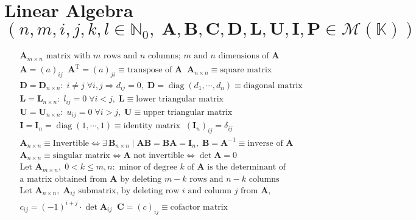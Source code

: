 \section*{\normalsize Linear Algebra {\normalfont\scriptsize $(n,m,i,j,k,l\!\in\!\mathbb{N}_0,\;\mathbf{A},\mathbf{B},\mathbf{C},\mathbf{D},\mathbf{L},\mathbf{U},\mathbf{I},\mathbf{P}\!\in\!\mathcal{M}(\mathbb{K}))$}}
\underline{}\normalfont\scriptsize{}
\begin{align*}
&\mathbf{A}_{m\times n}\text{ matrix with $m$ rows and $n$ columns; $m$ and $n$ dimensions of $\mathbf{A}$} \\
&\mathbf{A}\!=\!(a)_{ij}\;\; \mathbf{A}^{\operatorname{T}}\!=\!(a)_{ji}\!\equiv\!\text{transpose of $\mathbf{A}$}\;\; \mathbf{A}_{n\times n}\!\equiv\!\text{square matrix} \\
&\mathbf{D}\!=\!\mathbf{D}_{n\times n}:\; i\!\neq\!j\;\forall i,j\Rightarrow d_{ij}\!=\!0,\;\mathbf{D}\!=\!\operatorname{diag}(d_1,\cdots,d_n)\!\equiv\!\text{diagonal matrix} \\
&\mathbf{L}\!=\!\mathbf{L}_{n\times n}:\; l_{ij}\!=\!0\;\forall i\!<\!j,\;\mathbf{L}\!\equiv\!\text{lower triangular matrix} \\
&\mathbf{U}\!=\!\mathbf{U}_{n\times n}:\; u_{ij}\!=\!0\;\forall i\!>\!j,\;\mathbf{U}\!\equiv\!\text{upper triangular matrix} \\
&\mathbf{I}\!=\!\mathbf{I}_n\!=\!\operatorname{diag}(1,\cdots,1)\!\equiv\!\text{identity matrix}\;\;(\mathbf{I}_n)_{ij}\!=\!\delta_{ij} \\
&\mathbf{A}_{n\times n}\!\equiv\!\text{Invertible}\Leftrightarrow\exists\,\mathbf{B}_{n\times n}\;|\;\mathbf{AB}\!=\!\mathbf{BA}\!=\!\mathbf{I}_n,\;\mathbf{B}\!=\!\mathbf{A}^{-1}\!\equiv\!\text{inverse of $\mathbf{A}$} \\
&\mathbf{A}_{n\times n}\!\equiv\!\text{singular matrix}\Leftrightarrow\mathbf{A}\text{ not invertible}\Leftrightarrow\det\mathbf{A}\!=\!0 \\
&\text{Let }\mathbf{A}_{m\times n},\;0\!<\!k\!\leq\!m,n:\text{ minor of degree $k$ of $\mathbf{A}$ is the determinant of} \\
&\text{a matrix obtained from $\mathbf{A}$ by deleting $m\!-\!k$ rows and $n\!-\!k$ columns} \\
&\text{Let }\mathbf{A}_{n\times n},\;\mathbf{A}_{ij}\text{ submatrix, by deleting row $i$ and column $j$ from $\mathbf{A}$,} \\
&c_{ij}\!=\!(-1)^{i+j}\!\cdot\!\det\mathbf{A}_{ij}\;\;\mathbf{C}\!=\!(c)_{ij}\!\equiv\!\text{cofactor matrix} \\

\end{align*}
